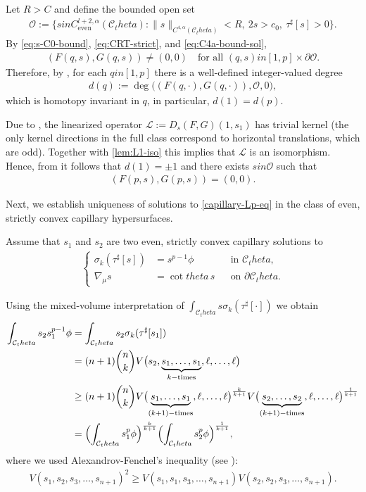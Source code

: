 \documentclass[12pt]{amsart}
\def\theta{theta}%
\def\in{in }%
\numberwithin{equation}{section}
\newcommand{\8}{\infty}
\newcommand{\cC}{\mathcal{C}}
\newcommand{\cL}{\mathcal{L}}
\newcommand{\cO}{\mathcal{O}}
\newcommand{\eq}[1]{\begin{equation}\begin{alignedat}{2}#1\end{alignedat}\end{equation}}
\newcommand{\Cth}{\cC_\theta}
\begin{document}
Let $R>C$ and define the bounded open set
\eq{
  \cO
  := \bigl\{s\in C^{l+2,\alpha}_{\mathrm{even}}(\Cth):
        \|s\|_{C^{4,\alpha}(\Cth)}<R,\ 2s>c_0,\ \tau^\sharp[s]>0\bigr\}.
}
By \eqref{eq:s-C0-bound}, \eqref{eq:CRT-strict}, and \eqref{eq:C4a-bound-sol}, 
\eq{
  (F(q,s),G(q,s))\neq (0,0)
  \quad\text{for all }(q,s)\in[1,p]\times\partial\cO.
}
Therefore, by \cite[Thm. 1]{LLN17}, for each $q\in[1,p]$ there is a well-defined
integer-valued degree
\eq{
  d(q) := \deg\bigl((F(q,\cdot),G(q,\cdot)),\cO,0\bigr),
}
which is homotopy invariant in $q$, in particular,
$d(1)=d(p)$.

Due to \cite[Lem. 5.4]{HIS25}, the linearized operator
$
  \cL := D_s(F,G)(1,s_1)
$
has trivial kernel (the only kernel directions in the full class correspond to
horizontal translations, which are odd). Together with \autoref{lem:L1-iso} this implies that
$\cL$ is an isomorphism. Hence, from \cite[Thm. 1.1, Cor. 2.1]{LLN17} it follows that $d(1) = \pm 1$
and there exists $s\in\cO$ such that
\eq{
  (F(p,s),G(p,s))=(0,0).
}

Next, we establish uniqueness of solutions to \eqref{capillary-Lp-eq}
in the class of even, strictly convex capillary hypersurfaces.

Assume that $s_1$ and $s_2$ are two even, strictly convex capillary solutions to
\eq{\label{key-eq-two-sols}
\left\{
\begin{aligned}
  \sigma_k(\tau^\sharp[s])
    &= s^{p-1} \phi
    &&\text{in }\Cth,\\
  \nabla_\mu s &= \cot\theta\,s
    &&\text{on }\partial\Cth.
\end{aligned}
\right.
}

Using the mixed-volume interpretation of $\int_{\Cth} s\sigma_k(\tau^\sharp[\cdot])$
we obtain
\eq{\label{key-ineq-1}
\int_{\cC_\theta} s_2 s_1^{p-1}\phi
  &= \int_{\cC_\theta} s_2\sigma_k(\tau^\sharp[s_1])\\
  &=(n+1) \binom{n}{k}V\bigl(s_2,\underbrace{s_1,\ldots,s_1}_{k-\text{times}},\ell,\ldots,\ell\bigr)\\
  &\ge (n+1) \binom{n}{k}
     V\bigl(\underbrace{s_1,\ldots,s_1}_{(k+1)-\text{times}},\ell,\ldots,\ell\bigr)^{\frac{k}{k+1}}
     V\bigl(\underbrace{s_2,\ldots,s_2}_{(k+1)-\text{times}},\ell,\ldots,\ell\bigr)^{\frac{1}{k+1}}\\
  &= \Bigl(\int_{\cC_\theta} s_1^p \phi\Bigr)^{\frac{k}{k+1}}
     \Bigl(\int_{\cC_\theta} s_2^p \phi\Bigr)^{\frac{1}{k+1}},
}
where we used Alexandrov-Fenchel's inequality (see \cite[Thm. 3.1]{MWWX25}):
\eq{\label{AF-ineq}
V(s_1,s_2,s_3,\ldots,s_{n+1})^2
  \ge V(s_1,s_1,s_3,\ldots,s_{n+1})
      V(s_2,s_2,s_3,\ldots,s_{n+1}).
}
\end{document}
